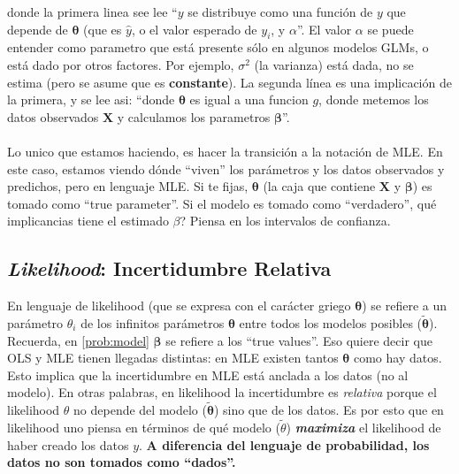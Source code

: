 \documentclass[10pt]{article}
\begin{document}
donde la primera linea see lee ``$y$ se distribuye como una funci\'on de $y$ que depende de $\bm{\theta}$ (que es $\hat{y}$, o el valor esperado de $y_{i}$, y $\alpha$''. El valor $\alpha$ se puede entender como parametro que est\'a presente s\'olo en algunos modelos GLMs, o est\'a dado por otros factores. Por ejemplo, $\sigma^{2}$ (la varianza) est\'a dada, no se estima (pero se asume que es {\bf constante}). La segunda l\'inea es una implicaci\'on de la primera, y se lee asi: ``donde $\bm{\theta}$ es igual a una funcion $g$, donde metemos los datos observados $\bm{X}$ y calculamos los parametros $\bm{\beta}$''.

\paragraph{} Lo unico que estamos haciendo, es hacer la transici\'on a la notaci\'on de MLE. En este caso, estamos viendo d\'onde ``viven'' los par\'ametros y los datos observados y predichos, pero en lenguaje MLE. Si te fijas, $\bm{\theta}$ (la caja que contiene $\bm{X}$ y $\bm{\beta}$) es tomado como ``true parameter''. {\color{red}Si el modelo es tomado como ``verdadero'', qu\'e implicancias tiene el estimado $\beta$? Piensa en los intervalos de confianza}.

\subsection*{\emph{Likelihood}: Incertidumbre Relativa}

En lenguaje de likelihood (que se expresa con el car\'acter griego $\bm{\theta}$) se refiere a un par\'ametro $\theta_{i}$ de los infinitos par\'ametros $\bm{\theta}$ entre todos los modelos posibles ($\bm{\tilde{\theta}}$). Recuerda, en \autoref{prob:model} $\bm{\beta}$ se refiere a los ``true values''. Eso quiere decir que OLS y MLE tienen llegadas distintas: en MLE existen tantos $\bm{\theta}$ como hay datos. Esto implica que la incertidumbre en MLE est\'a anclada a los datos (no al modelo). En otras palabras, en likelihood la incertidumbre es \emph{relativa} porque el likelihood $\theta$ no depende del modelo ($\bm{\tilde{\theta}}$) sino que de los datos. Es por esto que en likelihood uno piensa en t\'erminos de qu\'e modelo ($\tilde{\theta}$) \emph{{\bf maximiza}} el likelihood de haber creado los datos $y$. {\bf A diferencia del lenguaje de probabilidad, los datos no son tomados como ``dados''.}


 
\end{document}
